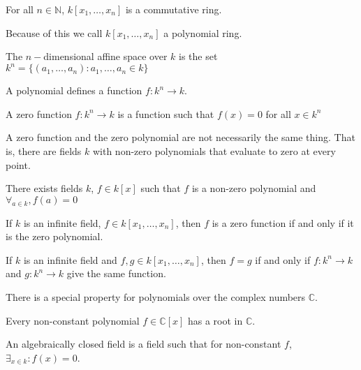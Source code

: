                 \begin{theorem}
                    For all $n\in\mathbb{N}$,
                    $k[x_1,\hdots ,x_n]$ is a commutative ring.
                \end{theorem}
                Because of this we call $k[x_1,\hdots ,x_n]$
                a polynomial ring.
                \begin{definition}
                    The $n-$dimensional affine space over $k$ is the set
                    $k^{n}=\{(a_1,\hdots,a_n):a_1,\hdots,a_n \in k\}$
                \end{definition}
                A polynomial defines a function $f:k^{n}\rightarrow{k}$.
                \begin{definition}
                    A zero function $f:k^{n}\rightarrow{k}$
                    is a function such that $f(x)=0$
                    for all $x\in{k^{n}}$
                \end{definition}
                A zero function and the zero polynomial are not necessarily
                the same thing. That is, there are fields $k$ with non-zero
                polynomials that evaluate to zero at every point.
                \begin{theorem}
                    There exists fields $k$, $f\in k[x]$ such
                    that $f$ is a non-zero polynomial and
                    $\forall_{a\in k},f(a)=0$
                \end{theorem}
                \begin{theorem}
                    If $k$ is an infinite field,
                    $f\in k[x_1,\hdots ,x_n]$, then $f$ is a
                    zero function if and only if it is
                    the zero polynomial.
                \end{theorem}
                \begin{theorem}
                    If $k$ is an infinite field and
                    $f,g\in k[x_1,\hdots,x_n]$, then $f=g$ if and
                    only if $f:k^n\rightarrow k$ and
                    $g:k^n \rightarrow k$ give
                    the same function.
                \end{theorem}
                There is a special property for polynomials
                over the complex numbers $\mathbb{C}$.
                \begin{theorem}
                    Every non-constant polynomial
                    $f\in\mathbb{C}[x]$ has a root in $\mathbb{C}$.
                \end{theorem}
                \begin{definition}
                    An algebraically closed field is a field
                    such that for non-constant $f$,
                    $\exists_{x\in k}:f(x)=0$.
                \end{definition}
